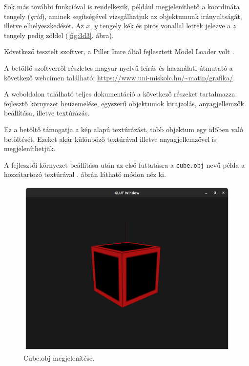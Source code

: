 Sok más további funkcióval is rendelkezik, például megjeleníthető a koordináta tengely (\textit{grid}), aminek segítségével vizsgálhatjuk az objektumunk irányultságát, illetve elhelyeszkedését. Az $x$, $y$ tengely kék és piros vonallal lettek jelezve a $z$ tengely pedig zöldel  (\ref{fig:3d3}. ábra).


Következő tesztelt szoftver, a Piller Imre által fejlesztett Model Loader volt \cite{imre2020model}.

A betöltő szoftverről részletes magyar nyelvű leírás és használati útmutató a következő webcímen található: \url{https://www.uni-miskolc.hu/~matip/grafika/}.

A weboldalon található teljes dokumentáció a következő részeket tartalmazza: fejlesztő környezet beüzemelése, egyszerű objektumok kirajzolás, anyagjellemzők beállítása, illetve textúrázás.

Ez a betöltő támogatja a kép alapú textúrázást, több objektum egy időben való betöltését. Ezeket akár különböző textúrával illetve anyagjellemzővel is megjeleníthetjük.

A fejlesztői környezet beállítása után az első futtatásra a \texttt{cube.obj} nevű példa a hozzátartozó textúrával . ábrán látható módon néz ki.

\begin{figure}[h]
\centering
\includegraphics[width=\textwidth]{images/Model_loader.png}
\caption{Cube.obj megjelenítése.}
\label{fig:model1}
\end{figure}


